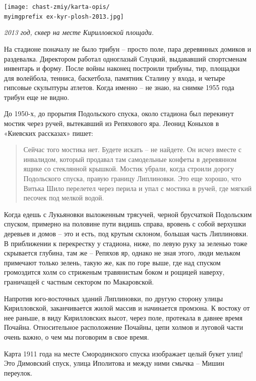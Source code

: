 \begin{center}
\texttt{[image: chast-zmiy/karta-opis/\\myimgprefix ex-kyr-plosh-2013.jpg]}

\textit{2013 год, сквер на месте Кирилловской площади.}
\end{center}

На стадионе поначалу не было трибун – просто поле, пара деревянных домиков и раздевалка. Директором работал одноглазый Слуцкий, выдававший спортсменам инвентарь и форму. После войны наконец построили трибуны, тир, площадки для волейбола, тенниса, баскетбола, памятник Сталину у входа, и четыре гипсовые скульптуры атлетов. Когда именно – не знаю, на снимке 1955 года трибун еще не видно.

До 1950-х, до прорытия Подольского спуска, около стадиона был перекинут мостик через ручей, вытекавший из Репяхового яра. Леонид Коныхов в «Киевских рассказах» пишет:

\begin{quotation}
Сейчас того мостика нет. Будете искать – не найдете. Он исчез вместе с инвалидом, который продавал там самодельные конфеты в деревянном ящике со стеклянной крышкой. Мостик убрали, когда строили дорогу Подольского спуска, правую границу Липлиновки. Это еще хорошо, что Витька Шило перелетел через перила и упал с мостика в ручей, где мягкий песочек под мелкой водой.
\end{quotation}

Когда едешь с Лукьяновки выложенным трясучей, черной брусчаткой Подольским спуском, примерно на половине пути видишь справа, вровень с собой верхушки деревьев и домов – это и есть, под крутым склоном, большая часть Липлиновки. В приближении к перекрестку у стадиона, ниже, по левую руку за зеленью тоже скрывается глубина, там же – Репяхов яр, однако не зная этого, люди мельком примечают только зелень, такую же, как по горе выше, где над спуском громоздится холм со стриженым травянистым боком и рощицей наверху, граничащей с частным сектором по Макаровской.

Напротив юго-восточных зданий Липлиновки, по другую сторону улицы Кирилловской, заканчивается жилой массив и начинается промзона. К востоку от нее раньше, в виду Кирилловских высот, через поле, протекала в давнее время Почайна. Относительное расположение Почайны, цепи холмов и луговой части очень важно, о чем мы поговорим в свое время.

Карта 1911 года на месте Смородинского спуска изображает целый букет улиц! Это Димовский спуск, улица Иполитова и между ними смычка – Мишин переулок.

